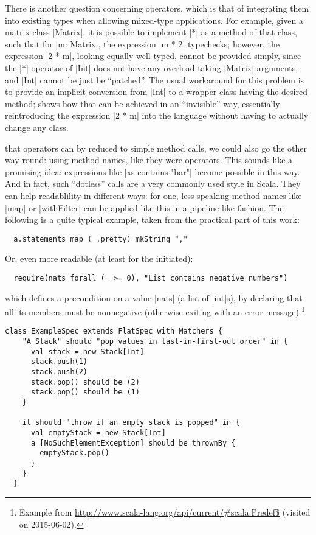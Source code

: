 There is another question concerning operators, which is that of integrating them into existing
types when allowing mixed-type applications. For example, given a matrix class |Matrix|, it is
possible to implement |*| as a method of that class, such that for |m: Matrix|, the expression %
|m * 2| typechecks; however, the expression |2 * m|, looking equally well-typed, cannot be provided
simply, since the |*| operator of |Int| does not have any overload taking |Matrix| arguments, and
|Int| cannot be just be \enquote{patched}. The usual workaround for this problem is to provide an
implicit conversion from |Int| to a wrapper class having the desired method;
 shows how that can be achieved in an \enquote{invisible} way, essentially
reintroducing the expression |2 * m| into the language without having to actually change any class.

 that operators can by reduced to simple method calls, we could
also go the other way round: using method names, like they were operators. This sounds like a
promising idea: expressions like |xs contains "bar"| become possible in this way. And in fact, such
\enquote{dotless} calls are a very commonly used style in Scala. They can help readablility in
different ways: for one, less-speaking method names like |map| or |withFilter| can be applied like
this in a pipeline-like fashion. The following is a quite typical example, taken from the practical
part of this work:
\begin{lstlisting}
  a.statements map (_.pretty) mkString ","
\end{lstlisting}
Or, even more readable (at least for the initiated):
\begin{lstlisting}
  require(nats forall (_ >= 0), "List contains negative numbers")
\end{lstlisting}
which defines a precondition on a value |nats| (a list of |int|s), by declaring that all its members
must be nonnegative (otherwise exiting with an error message).\footnote{Example from
  \protect\url{http://www.scala-lang.org/api/current/\#scala.Predef$} (visited on 2015-06-02).}%

\begin{lstlisting}[style=floating, caption={Example of a ScalaTest \dsl{} for writing unit tests in
    a natural-language-like specification. This example is taken from \url{http://www.scalatest.org}
    (visited on 2015-05-21) and slightly modified. Also note the anaphoric use of \lstinline|it| in
    Line~10.},
  label=lst:scalatest]
  class ExampleSpec extends FlatSpec with Matchers {
    "A Stack" should "pop values in last-in-first-out order" in {
      val stack = new Stack[Int]
      stack.push(1)
      stack.push(2)
      stack.pop() should be (2)
      stack.pop() should be (1)
    }

    it should "throw if an empty stack is popped" in {
      val emptyStack = new Stack[Int]
      a [NoSuchElementException] should be thrownBy {
        emptyStack.pop()
      } 
    }
  }
\end{lstlisting}

